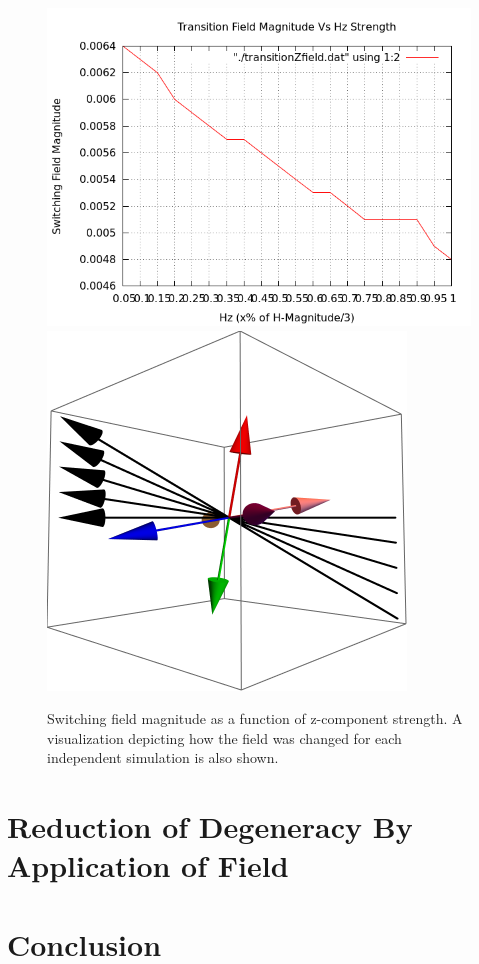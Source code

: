 \documentclass{article}
\begin{document}
\begin{figure}[ht]
\centering
 \includegraphics[scale=0.5]{VariedZdirection/transitionZfield.png}
 \includegraphics[scale=0.7]{VariedZdirection/illustration.png}
 \caption{Switching field magnitude as a function of z-component strength. A visualization depicting how the field
 was changed for each independent simulation is also shown.}
\end{figure}
\clearpage

\section{Reduction of Degeneracy By Application of Field}
\section{Conclusion}
\end{document}
